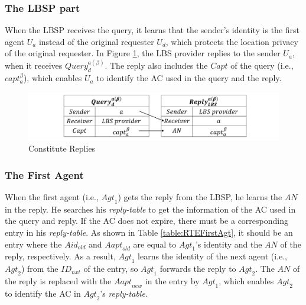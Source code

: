 \subsubsection{The LBSP part}

\noindent When the LBSP receives the query, it learns that the sender's identity is the first agent $U_a$ instead of the original requester $U_d$, which protects the location privacy of the original requester. In Figure \ref{fig:ConstituteReplies}, the LBS provider replies to the sender $U_a$, when it receives ${Query}^{a\left(\beta\right)}_d$. The reply also includes the $Capt$ of the query (i.e., $capt_a^\beta$), which enables $U_a$ to identify the AC used in the query and the reply.

\begin{figure} [H]
\centering 
\includegraphics[width=6.0in]{figures/FIG_4_6_Constitute_Replies.png}
\caption{Constitute Replies} 
\label{fig:ConstituteReplies} %
\end{figure}

\subsubsection{The First Agent}

\noindent When the first agent (i.e., ${Agt}_1$) gets the reply from the LBSP, he learns the $AN$ in the reply. He searches his \textit{reply-table} to get the information of the AC used in the query and reply. If the AC does not expire, there must be a corresponding entry in his \textit{reply-table}. As shown in Table \ref{table:RTEFirstAgt}, it should be an entry where the $Aid_{old}$ and ${Aapt}_{old}$ are equal to ${Agt}_1$'s identity and the $AN$ of the reply, respectively. As a result, ${Agt}_1$ learns the identity of the next agent (i.e., ${Agt}_2$) from the ${ID}_{nxt}$ of the entry, so ${Agt}_1$ forwards the reply to ${Agt}_2$. The $AN$ of the reply is replaced with the ${Aapt}_{new}$ in the entry by ${Agt}_1$, which enables ${Agt}_2$ to identify the AC in ${Agt}_2$'s \textit{reply-table}.

